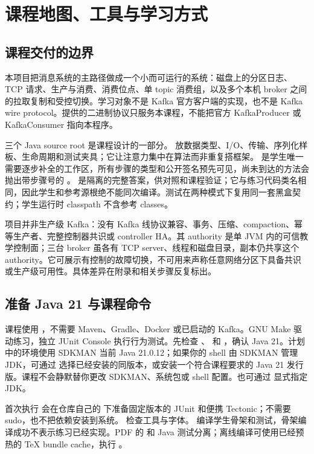 \chapter{课程地图、工具与学习方式}

\section{课程交付的边界}
本项目把消息系统的主路径做成一个小而可运行的系统：磁盘上的分区日志、TCP 请求、生产与消费、消费位点、单 topic 消费组，以及多个本机 broker 之间的拉取复制和受控切换。学习对象不是 Kafka 官方客户端的实现，也不是 Kafka wire protocol。提供的二进制协议只服务本课程，不能把官方 KafkaProducer 或 KafkaConsumer 指向本程序。

三个 Java source root 是课程设计的一部分。 放数据类型、I/O、传输、序列化样板、生命周期和测试夹具；它让注意力集中在算法而非重复搭框架。 是学生唯一需要逐步补全的工作区，所有步骤的类型和公开签名预先可见，尚未到达的方法会抛出带步骤号的 。 是隔离的完整答案，供对照和课程验证；它与练习代码类名相同，因此学生和参考源根绝不能同次编译。测试在两种模式下复用同一套黑盒契约；学生运行时 classpath 不含参考 classes。

项目并非生产级 Kafka：没有 Kafka 线协议兼容、事务、压缩、compaction、幂等生产者、完整控制器共识或 controller HA。其 authority 是单 JVM 内的可信教学控制面；三台 broker 虽各有 TCP server、线程和磁盘目录，副本仍共享这个 authority。它可展示有控制的故障切换，不可用来声称任意网络分区下具备共识或生产级可用性。具体差异在附录和相关步骤反复标出。

\section{准备 Java 21 与课程命令}
课程使用 ，不需要 Maven、Gradle、Docker 或已启动的 Kafka。GNU Make 驱动练习，独立 JUnit Console 执行行为测试。先检查 、 和 ，确认 Java 21。计划中的环境使用 SDKMAN 当前 Java 21.0.12；如果你的 shell 由 SDKMAN 管理 JDK，可通过  选择已经安装的同版本，或安装一个符合课程要求的 Java 21 发行版。课程不会静默替你更改 SDKMAN、系统包或 shell 配置。也可通过  显式指定 JDK。

首次执行  会在仓库自己的  下准备固定版本的 JUnit 和便携 Tectonic；不需要 sudo，也不把依赖安装到系统。 检查工具与字体。 编译学生骨架和测试，骨架编译成功不表示练习已经实现。PDF 的  和 Java 测试分离；离线编译可使用已经预热的 TeX bundle cache，执行 。

